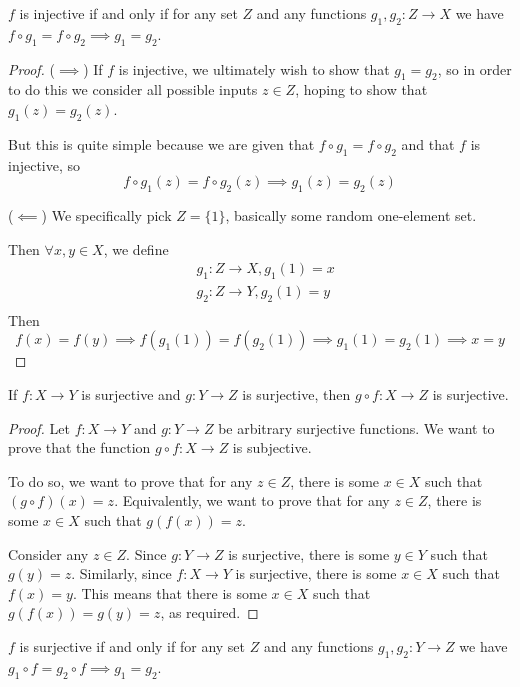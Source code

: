 \begin{proposition}
$f$ is injective if and only if for any set $Z$ and any functions $g_1,g_2:Z\to X$ we have $f\circ g_1=f\circ g_2 \implies g_1=g_2$.
\end{proposition}

\begin{proof}
($\implies$) If $f$ is injective, we ultimately wish to show that $g_1=g_2$, so in order to do this we consider all possible inputs $z \in Z$, hoping to show that $g_1(z)=g_2(z)$.

But this is quite simple because we are given that $f\circ g_1=f\circ g_2$ and that $f$ is injective, so
\[ f \circ g_1(z)=f \circ g_2(z) \implies g_1(z)=g_2(z) \]

($\impliedby$) We specifically pick $Z=\{1\}$, basically some random one-element set.

Then $\forall x,y \in X$, we define
\begin{align*}
& g_1:Z \to X, g_1(1)=x \\
& g_2:Z \to Y, g_2(1)=y \\
\end{align*}
Then
\[ f(x)=f(y) \implies f(g_1(1))=f(g_2(1)) \implies g_1(1)=g_2(1) \implies x=y \]
\end{proof}

\begin{proposition}
If $f:X\to Y$ is surjective and $g:Y\to Z$ is surjective, then $g \circ f:X\to Z$ is surjective.
\end{proposition}
\begin{proof}
Let $f:X\to Y$ and $g:Y\to Z$ be arbitrary surjective functions. We want to prove that the function $g \circ f:X\to Z$ is subjective. 

To do so, we want to prove that for any $z \in Z$, there is some $x \in X$ such that $(g \circ f)(x) = z$. Equivalently, we want to prove that for any $z \in Z$, there is some $x \in X$ such that $g(f(x)) = z$.

Consider any $z \in Z$. Since $g:Y\to Z$ is surjective, there is some $y \in Y$ such that $g(y) = z$. Similarly, since $f:X\to Y$ is surjective, there is some $x \in X$ such that $f(x) = y$. This means that there is some $x \in X$ such that $g(f(x)) = g(y) = z$, as required.
\end{proof}

\begin{proposition}
$f$ is surjective if and only if for any set $Z$ and any functions $g_1,g_2:Y\to Z$ we have $g_1 \circ f=g_2 \circ f \implies g_1=g_2$.
\end{proposition}

